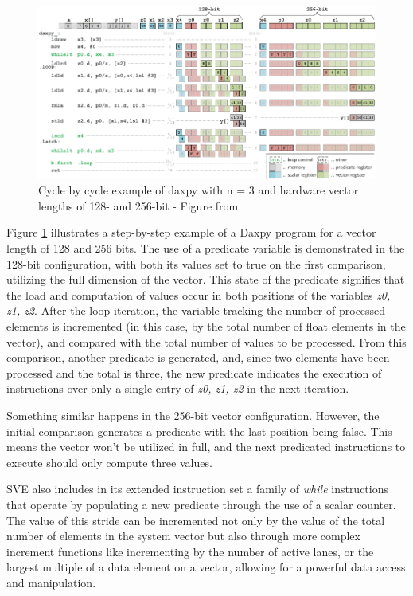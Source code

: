 \begin{figure}[H]
	\begin{center}
 		\includegraphics[width=0.77\linewidth]{images/predicator-example.pdf}
 		\caption{Cycle by cycle example of daxpy with n = 3 and hardware vector lengths of 128- and 256-bit - Figure from \cite{arm-paper}}
 		\label{fig:arm-sve-assembly}
	\end{center} 
\end{figure}

Figure \ref{fig:arm-sve-assembly} illustrates a step-by-step example of a Daxpy program for a vector length of 128 and 256 bits. The use of a predicate variable is demonstrated in the 128-bit configuration, with both its values set to true on the first comparison, utilizing the full dimension of the vector. This state of the predicate signifies that the load and computation of values occur in both positions of the variables \textit{z0, z1, z2}. After the loop iteration,  the variable tracking the number of processed elements is incremented (in this case, by the total number of float elements in the vector), and compared with the total number of values to be processed. From this comparison, another predicate is generated, and, since two elements have been processed and the total is three, the new predicate indicates the execution of instructions over only a single entry of \textit{z0, z1, z2} in the next iteration.

Something similar happens in the 256-bit vector configuration. However, the initial comparison generates a predicate with the last position being false. This means the vector won't be utilized in full, and the next predicated instructions to execute should only compute three values.

SVE also includes in its extended instruction set a family of \textit{while} instructions that operate by populating a new predicate through the use of a scalar counter. The value of this stride can be incremented not only by the value of the total number of elements in the system vector but also through more complex increment functions like incrementing by the number of active lanes, or the largest multiple of a data element on a vector, allowing for a powerful data access and manipulation. 

